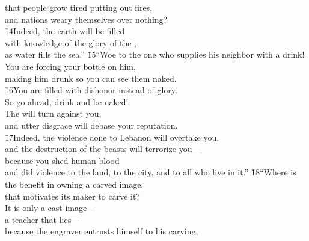 \begin{poetry}
\poemll    that people grow tired putting out fires, \\
\poemlll       and nations weary themselves over nothing? \\
\poeml \v{14}Indeed, the earth will be filled \\
\poemll    with knowledge of the glory of the , \\
\poemlll       as water fills the sea.''
\poeml \v{15}``Woe to the one who supplies his neighbor with a drink! \\
\poemll    You are forcing your bottle on him, \\
\poemlll       making him drunk so you can see them naked. \\
\poeml \v{16}You are filled with dishonor instead of glory. \\
\poemll    So go ahead, drink and be naked! \\
\poemll    The  will turn against you, \\
\poemll    and utter disgrace will debase your reputation. \\
\poeml \v{17}Indeed, the violence done to Lebanon will overtake you, \\
\poemll    and the destruction of the beasts will terrorize you--- \\
\poeml because you shed human blood \\
\poemll    and did violence to the land, to the city, and to all who live in it.''
\poeml \v{18}``Where is the benefit in owning a carved image, \\
\poemll    that motivates its maker to carve it? \\
\poeml It is only a cast image--- \\
\poemll    a teacher that lies--- \\
\poeml because the engraver entrusts himself to his carving, \\

\end{poetry}
